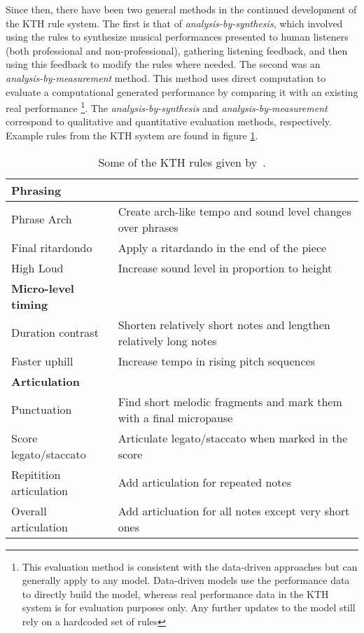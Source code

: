Since then, there have been two general methods in the continued development of the KTH rule system. The first is that of \emph{analysis-by-synthesis}, which involved using the rules to synthesize musical performances presented to human listeners (both professional and non-professional), gathering listening feedback, and then using this feedback to modify the rules where needed. The second was an \emph{analysis-by-measurement} method. This method uses direct computation to evaluate a computational generated performance by comparing it with an existing real performance%
\footnote{This evaluation method is consistent with the data-driven approaches but can generally apply to any model. Data-driven models use the performance data to directly build the model, whereas real performance data in the KTH system is for evaluation purposes only. Any further updates to the model still rely on a hardcoded set of rules}. The \emph{analysis-by-synthesis} and \emph{analysis-by-measurement} correspond to qualitative and quantitative evaluation methods, respectively. Example rules from the KTH system are found in figure \ref{tab:kth-rules}.


\begin{table}
    \setlength{\extrarowheight}{7pt}
    \begin{center}
    \begin{tabular}{l | l }
        \textbf{Phrasing} & \\
        \hline
        Phrase Arch & Create arch-like tempo and sound level changes over phrases \\
        Final ritardondo & Apply a ritardando in the end of the piece \\
        High Loud & Increase sound level in proportion to height \\
        \textbf{Micro-level timing} & \\
        \hline
        Duration contrast & Shorten relatively short notes and lengthen relatively long notes \\ 
        Faster uphill & Increase tempo in rising pitch sequences \\
        \textbf{Articulation} & \\
        \hline
        Punctuation & Find short melodic fragments and mark them with a final micropause \\
        Score legato/staccato & Articulate legato/staccato when marked in the score \\
        Repitition articulation & Add articulation for repeated notes \\
        Overall articulation & Add articluation for all notes except very short ones 
    \end{tabular}
    \caption{Some of the KTH rules given by~\citet{friberg2006overview}.}
    \label{tab:kth-rules}
    \end{center}
\end{table}

